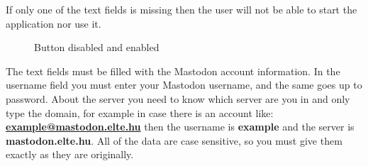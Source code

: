 If only one of the text fields is missing then the user will not be able
to start the application nor use it. 
\begin{figure}[H]
	\centering
	\hspace{5pt}
	\caption{Button disabled and enabled}
	\label{fig:buttonenabled}
\end{figure}
The text fields must be filled with the Mastodon account information.
In the username field you must enter your Mastodon username, and the
same goes up to password. About the server you need to know which server
are you in and only type the domain, for example in case there is an account
like: \textbf{\url{example@mastodon.elte.hu}} then the username is \textbf{example} and the server is
\textbf{mastodon.elte.hu}. All of the data are case sensitive, so you must give them
exactly as they are originally.

